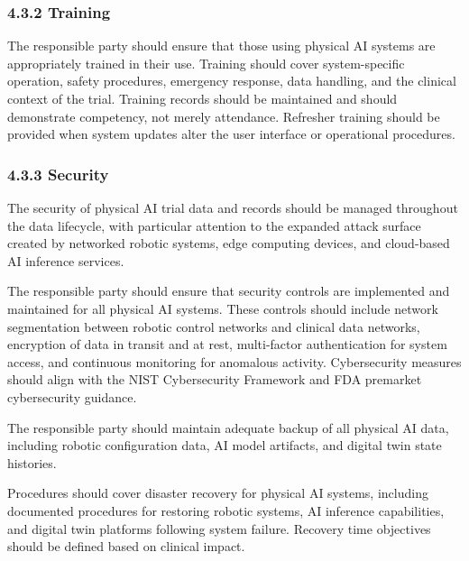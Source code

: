 \subsubsection{4.3.2 Training}

The responsible party should ensure that those using physical AI systems are appropriately trained in their use. Training should cover system-specific operation, safety procedures, emergency response, data handling, and the clinical context of the trial. Training records should be maintained and should demonstrate competency, not merely attendance. Refresher training should be provided when system updates alter the user interface or operational procedures.

\subsubsection{4.3.3 Security}

\begin{description}[leftmargin=2.5cm,style=sameline]

\item[(a)] The security of physical AI trial data and records should be managed throughout the data lifecycle, with particular attention to the expanded attack surface created by networked robotic systems, edge computing devices, and cloud-based AI inference services.

\item[(b)] The responsible party should ensure that security controls are implemented and maintained for all physical AI systems. These controls should include network segmentation between robotic control networks and clinical data networks, encryption of data in transit and at rest, multi-factor authentication for system access, and continuous monitoring for anomalous activity. Cybersecurity measures should align with the NIST Cybersecurity Framework and FDA premarket cybersecurity guidance.

\item[(c)] The responsible party should maintain adequate backup of all physical AI data, including robotic configuration data, AI model artifacts, and digital twin state histories.

\item[(d)] Procedures should cover disaster recovery for physical AI systems, including documented procedures for restoring robotic systems, AI inference capabilities, and digital twin platforms following system failure. Recovery time objectives should be defined based on clinical impact.

\end{description}


